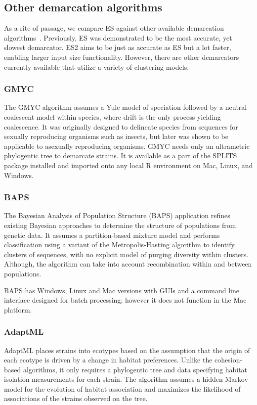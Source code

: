 \subsection*{Other demarcation algorithms}
As a rite of passage, we compare ES against other available demarcation algorithms~\cite{carlo}.
Previously, ES was demonstrated to be the most accurate, yet slowest demarcator.
ES2 aims to be just as accurate as ES but a lot faster, enabling larger input size functionality.
However, there are other demarcators currently available that utilize a variety of clustering models.

\subsubsection*{GMYC~\cite{barraclough2009inferring}}
The GMYC algorithm assumes a Yule model of speciation followed by a neutral coalescent model within species, where drift is the only process yielding coalescence.
It was originally designed to delineate species from sequences for sexually reproducing organisms such as insects, but later was shown to be applicable to asexually reproducing organisms.
GMYC needs only an ultrametric phylogentic tree to demarcate strains.
It is available as a part of the SPLITS package installed and imported onto any local R environment on Mac, Linux, and Windows.

\subsubsection*{BAPS~\cite{corander2007bayesian}}
The Bayesian Analysis of Population Structure (BAPS) application refines existing Bayesian approaches to determine the structure of populations from genetic data.
It assumes a partition-based mixture model and performs classification using a variant of the Metropolis-Hasting algorithm to identify clusters of sequences, with no explicit model of purging diversity within clusters.
Although, the algorithm can take into account recombination within and between populations.

BAPS has Windows, Linux and Mac versions with GUIs and a command line interface designed for batch processing; however it does not function in the Mac platform.

\subsubsection*{AdaptML~\cite{hunt2008resource}}
AdaptML places strains into ecotypes based on the assumption that the origin of each ecotype is driven by a change in habitat preferences.
Unlike the cohesion-based algorithms, it only requires a phylogentic tree and data specifying habitat isolation measurements for each strain.
The algorithm assumes a hidden Markov model for the evolution of habitat association and maximizes the likelihood of associations of the strains observed on the tree.

